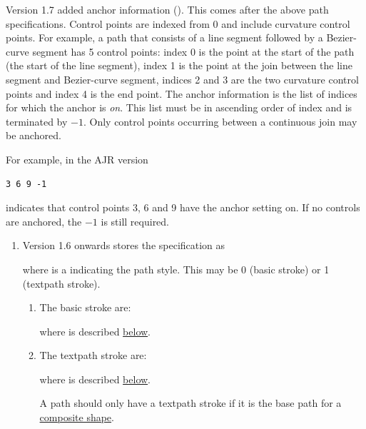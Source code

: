 \begin{numbered}
Version 1.7 added anchor information (). This comes
after the above path specifications. Control points are
indexed from 0 and include curvature control points. For example, a
path that consists of a line segment followed by a \gls{Bezier-curve} segment
has 5 control points: index 0 is the point at the start of the path
(the start of the line segment), index 1 is the point at the join
between the line segment and \gls{Bezier-curve} segment, indices 2 and 3 are
the two curvature control points and index 4 is the end point. The
anchor information is the list of  indices for which the anchor is
\emph{on}. This list must be in ascending order of index and is
terminated by $-1$. Only control points occurring between a
continuous join may be anchored.

For example, in the \gls{AJR} version
\begin{verbatim}
3 6 9 -1
\end{verbatim}
indicates that control points 3, 6 and 9 have the anchor setting on.
If no controls are anchored, the $-1$ is still required.

  \begin{enumerate}
  \item\label{jdr:pathstyle} Version 1.6 onwards stores the 
  specification as
  \begin{syntaxline}
   
  \end{syntaxline}
  where  is a 
  indicating the path style. This may be 0 (basic stroke) or 1
  (\gls{textpath} stroke).

    \begin{enumerate}
    \item The basic stroke  are:
    \begin{syntaxline}
      
    \end{syntaxline}
    where  is described \hyperref[jdr:linestyle]{below}.

    \item The \gls*{textpath} stroke  are:
    \begin{syntaxline}
     
    \end{syntaxline}
    where  is described
    \hyperref[jdr:textpathstroke]{below}.

    A path should only have a \gls*{textpath} stroke if it is the
    base path for a \hyperref[jdr:composite]{composite shape}.
    \end{enumerate}


\end{enumerate}
\end{numbered}
